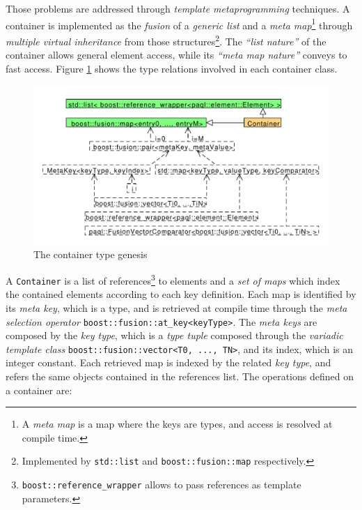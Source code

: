 \documentclass[10pt]{article}  %
\begin{document}
        Those problems are addressed through \emph{template metaprogramming} techniques.
        A container is implemented as the \emph{fusion} of a \emph{generic list} and a \emph{meta map}\footnote{
        A \emph{meta map} is a map where the keys are types, and access is resolved at compile time.} through \emph{multiple virtual inheritance}
        from those structures\footnote{Implemented by \texttt{std::list} and \texttt{boost::fusion::map} respectively.}.
        The \emph{``list nature''} of the container allows general element access, while its \emph{``meta map nature''}
        conveys to fast access. Figure \ref{fig:containerUML} shows the type relations involved in each container class.
        \begin{figure}[htbp]
            \centering
            \includegraphics[scale=0.5]{Container.pdf}
            \caption{The container type genesis}\label{fig:containerUML}
        \end{figure}
        A \texttt{Container} is a list of references\footnote{\texttt{boost::reference_wrapper} allows to pass references as template parameters.} to elements and a \emph{set of maps} which index the contained elements
        according to each key definition. Each map is identified by its \emph{meta key}, which is a type, and is
        retrieved at compile time through the \emph{meta selection operator} \texttt{boost::fusion::at_key<keyType>}.
        The \emph{meta keys} are composed by the \emph{key type}, which is a \emph{type tuple} composed through the \emph{variadic
        template class} \texttt{boost::fusion::vector<T0, ..., TN>}, and its index, which is an integer constant.
        Each retrieved map is indexed by the related \emph{key type}, and refers the same objects contained
        in the references list.
        The operations defined on a container are:
\end{document}
